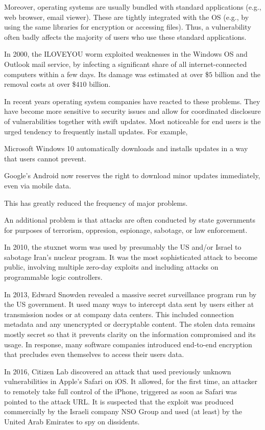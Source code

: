 Moreover, operating systems are usually bundled with standard applications (e.g., web browser, email viewer).
These are tightly integrated with the OS (e.g., by using the same libraries for encryption or accessing files).
Thus, a vulnerability often badly affects the majority of users who use these standard applications.

In 2000, the ILOVEYOU worm exploited weaknesses in the Windows OS and Outlook mail service, by infecting a significant share of all internet-connected computers within a few days.
Its damage was estimated at over \$$5$ billion and the removal costs at over \$$410$ billion.

In recent years operating system companies have reacted to these problems.
They have become more sensitive to security issues and allow for coordinated disclosure of vulnerabilities together with swift updates.
Most noticeable for end users is the urged tendency to frequently install updates.
For example,
\begin{compactitem}
\item Microsoft Windows 10 automatically downloads and installs updates in a way that users cannot prevent.
\item Google's Android now reserves the right to download minor updates immediately, even via mobile data.
\end{compactitem}
This has greatly reduced the frequency of major problems.

An additional problem is that attacks are often conducted by state governments for purposes of terrorism, oppresion, espionage, sabotage, or law enforcement.

In 2010, the stuxnet worm was used by presumably the US and/or Israel to sabotage Iran's nuclear program.
It was the most sophisticated attack to become public, involving multiple zero-day exploits and including attacks on programmable logic controllers.

In 2013, Edward Snowden revealed a massive secret surveillance program run by the US government.
It used many ways to intercept data sent by users either at transmission nodes or at company data centers.
This included connection metadata and any unencrypted or decryptable content.
The stolen data remains mostly secret so that it prevents clarity on the information compromised and its usage.
In response, many software companies introduced end-to-end encryption that precludes even themselves to access their users data.

In 2016, Citizen Lab discovered an attack that used previously unknown vulnerabilities in Apple's Safari on iOS.
It allowed, for the first time, an attacker to remotely take full control of the iPhone, triggered as soon as Safari was pointed to the attack URL.
It is suspected that the exploit was produced commercially by the Israeli company NSO Group and used (at least) by the United Arab Emirates to spy on dissidents.

